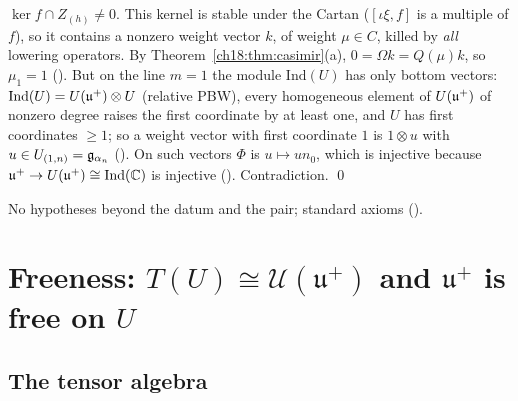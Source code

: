 $\ker f\cap Z_{(h)}\ne0$.  This kernel is stable under the Cartan ($[\iota\xi,f]$ is a multiple of $f$), so it contains a nonzero weight
vector $k$, of weight $\mu\in C$, killed by \emph{all} lowering operators.  By Theorem~\ref{ch18:thm:casimir}(a), $0=\Omega k=Q(\mu)k$, so
$\mu_1=1$ ().  But on the line $m=1$ the module $\mathrm{Ind}(U)$ has only bottom vectors: $\mathrm{Ind}(U)=\mathcal
\mathcal U(\mathfrak{u}^+)\otimes U$ (relative PBW), every homogeneous element of $\mathcal \mathcal U(\mathfrak{u}^+)$ of nonzero degree raises the first coordinate by
at least one, and $U$ has first coordinates $\ge1$; so a weight vector with first coordinate $1$ is $1\otimes u$ with $u\in U_{(1,n)}=
\mathfrak{g}_{\alpha_n}$ ().  On such vectors $\Phi$ is $u\mapsto un_0$, which is injective because
$\mathfrak{u}^+\to\mathcal \mathcal U(\mathfrak{u}^+)\cong \mathrm{Ind}(\mathbb C)$ is injective ().  Contradiction. \qed
\begin{status}No hypotheses beyond the datum and the pair; standard axioms ().\end{status}

\section{Freeness: \texorpdfstring{$T(U)\cong \mathcal U(\mathfrak u^+)$}{T(U) = U(u+)} and \texorpdfstring{$\mathfrak u^+$}{u+} is free on \texorpdfstring{$U$}{U}}\label{ch18:sec:free}

\subsection{The tensor algebra}


